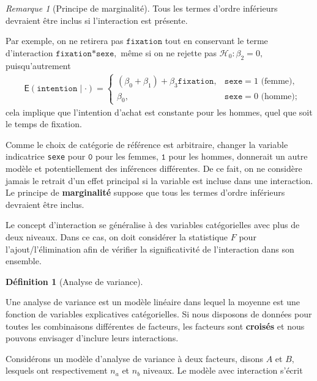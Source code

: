 \documentclass[
  11pt,
  letterpaper,
]{scrbook}
\theoremstyle{plain}
\theoremstyle{plain}
\theoremstyle{definition}
\theoremstyle{definition}
\newtheorem{definition}{Définition}[chapter]
\theoremstyle{remark}
\newtheorem{refremark}{Remarque}[chapter]
\begin{document}
\begin{refremark}[Principe de marginalité]
Tous les termes d'ordre inférieurs devraient être inclus si
l'interaction est présente.

Par exemple, on ne retirera pas \(\texttt{fixation}\) tout en conservant
le terme d'interaction \(\texttt{fixation*sexe},\) même si on ne rejette
pas \(\mathscr{H}_0:\beta_2=0,\) puisqu'autrement \begin{align*}
&\mathsf{E}(\texttt{intention} \mid \cdot) =
\begin{cases}
(\beta_0 + \beta_1) + \beta_3\texttt{fixation}, & \texttt{sexe}=1 \text{ (femme)},\\
  \beta_0, &\texttt{sexe}=0 \text{ (homme)};                 
\end{cases}
\end{align*} cela implique que l'intention d'achat est constante pour
les hommes, quel que soit le temps de fixation.

Comme le choix de catégorie de référence est arbitraire, changer la
variable indicatrice \texttt{sexe} pour \(\texttt{0}\) pour les femmes,
\(\texttt{1}\) pour les hommes, donnerait un autre modèle et
potentiellement des inférences différentes. De ce fait, on ne considère
jamais le retrait d'un effet principal si la variable est incluse dans
une interaction. Le principe de \textbf{marginalité} suppose que tous
les termes d'ordre inférieurs devraient être inclus.

\label{rem-marginalite}

\end{refremark}

Le concept d'interaction se généralise à des variables catégorielles
avec plus de deux niveaux. Dans ce cas, on doit considérer la
statistique \(F\) pour l'ajout/l'élimination afin de vérifier la
significativité de l'interaction dans son ensemble.

\begin{definition}[Analyse de
variance]\protect\hypertarget{def-anova}{}\label{def-anova}

Une analyse de variance est un modèle linéaire dans lequel la moyenne
est une fonction de variables explicatives catégorielles. Si nous
disposons de données pour toutes les combinaisons différentes de
facteurs, les facteurs sont \textbf{croisés} et nous pouvons envisager
d'inclure leurs interactions.

\end{definition}

Considérons un modèle d'analyse de variance à deux facteurs, disons
\(A\) et \(B,\) lesquels ont respectivement \(n_a\) et \(n_b\) niveaux.
Le modèle avec interaction s'écrit
\end{document}
